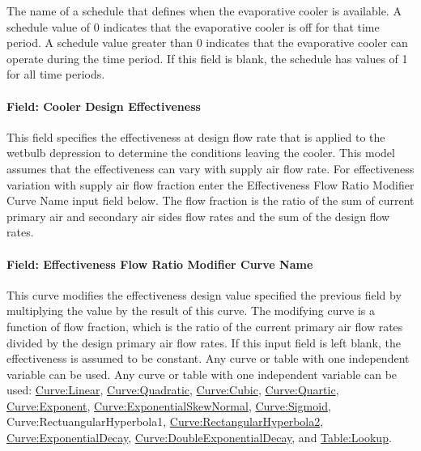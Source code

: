 The name of a schedule that defines when the evaporative cooler is available. A schedule value of 0 indicates that the evaporative cooler is off for that time period. A schedule value greater than 0 indicates that the evaporative cooler can operate during the time period. If this field is blank, the schedule has values of 1 for all time periods.

\paragraph{Field: Cooler Design Effectiveness}\label{field-cooler-design-effectiveness}

This field specifies the effectiveness at design flow rate that is applied to the wetbulb depression to determine the conditions leaving the cooler. This model assumes that the effectiveness can vary with supply air flow rate. For effectiveness variation with supply air flow fraction enter the Effectiveness Flow Ratio Modifier Curve Name input field below. The flow fraction is the ratio of the sum of current primary air and secondary air sides flow rates and the sum of the design flow rates.

\paragraph{Field: Effectiveness Flow Ratio Modifier Curve Name}\label{field-effectiveness-flow-ratio-modifier-curve-name}

This curve modifies the effectiveness design value specified the previous field by multiplying the value by the result of this curve. The modifying curve is a function of flow fraction, which is the ratio of the current primary air flow rates divided by the design primary air flow rates. If this input field is left blank, the effectiveness is assumed to be constant. Any curve or table with one independent variable can be used. Any curve or table with one independent variable can be used: \hyperref[curvelinear]{Curve:Linear}, \hyperref[curvequadratic]{Curve:Quadratic}, \hyperref[curvecubic]{Curve:Cubic}, \hyperref[curvequartic]{Curve:Quartic}, \hyperref[curveexponent]{Curve:Exponent}, \hyperref[curveexponentialskewnormal]{Curve:ExponentialSkewNormal}, \hyperref[curvesigmoid]{Curve:Sigmoid}, Curve:RectuangularHyperbola1, \hyperref[curverectangularhyperbola2]{Curve:RectangularHyperbola2}, \hyperref[curveexponentialdecay]{Curve:ExponentialDecay}, \hyperref[curvedoubleexponentialdecay]{Curve:DoubleExponentialDecay}, and \hyperref[tablelookup]{Table:Lookup}.

